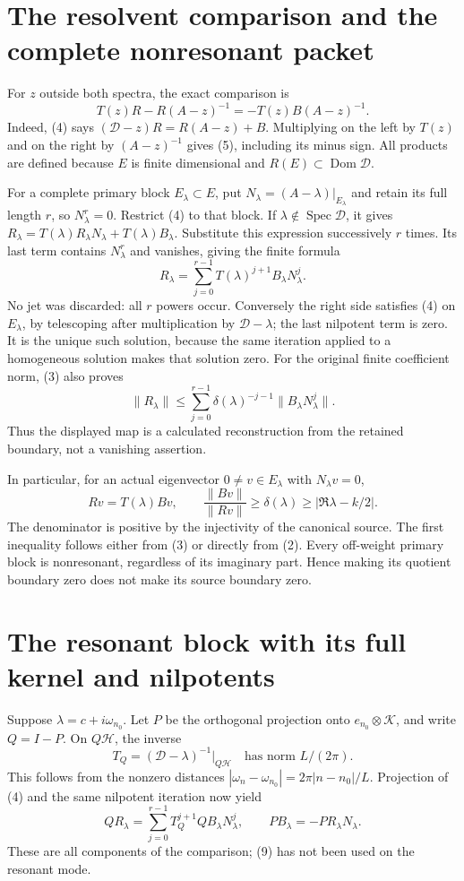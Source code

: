 \documentclass[11pt]{article}
\begin{document}
\section{The resolvent comparison and the complete nonresonant packet}
For \(z\) outside both spectra, the exact comparison is
\[
 T(z)R-R(A-z)^{-1}=-T(z)B(A-z)^{-1}.
 \tag{5}
\]
Indeed, (4) says
\((\mathscr D-z)R=R(A-z)+B\). Multiplying on the left by
\(T(z)\) and on the right by \((A-z)^{-1}\) gives (5), including
its minus sign. All products are defined because \(E\) is finite
dimensional and \(R(E)\subset\operatorname{Dom}\mathscr D\).

For a complete primary block \(E_\lambda\subset E\), put
\(N_\lambda=(A-\lambda)|_{E_\lambda}\) and retain its full
length \(r\), so \(N_\lambda^r=0\). Restrict (4) to that block.
If \(\lambda\notin\operatorname{Spec}\mathscr D\), it gives
\(R_\lambda=T(\lambda)R_\lambda N_\lambda+T(\lambda)B_\lambda\).
Substitute this expression successively \(r\) times. Its last
term contains \(N_\lambda^r\) and vanishes, giving the finite formula
\[
 \boxed{R_\lambda=
 \sum_{j=0}^{r-1}T(\lambda)^{j+1}B_\lambda N_\lambda^j.}
 \tag{6}
\]
No jet was discarded: all \(r\) powers occur. Conversely the right
side satisfies (4) on \(E_\lambda\), by telescoping after
multiplication by \(\mathscr D-\lambda\); the last nilpotent term
is zero. It is the unique such solution, because the same iteration
applied to a homogeneous solution makes that solution zero.
For the original finite coefficient norm, (3) also proves
\[
 \|R_\lambda\|
 \le\sum_{j=0}^{r-1}\delta(\lambda)^{-j-1}
                     \|B_\lambda N_\lambda^j\|.
 \tag{7}
\]
Thus the displayed map is a calculated reconstruction from the
retained boundary, not a vanishing assertion.

In particular, for an actual eigenvector \(0\ne v\in E_\lambda\)
with \(N_\lambda v=0\),
\[
 Rv=T(\lambda)Bv,\qquad
 \frac{\|Bv\|}{\|Rv\|}\ge\delta(\lambda)
 \ge|\Re\lambda-k/2|.
 \tag{8}
\]
The denominator is positive by the injectivity of the canonical
source. The first inequality follows either from (3) or directly
from (2). Every off-weight primary block is nonresonant, regardless
of its imaginary part. Hence making its quotient boundary zero does
not make its source boundary zero.

\section{The resonant block with its full kernel and nilpotents}
Suppose \(\lambda=c+i\omega_{n_0}\). Let \(P\) be the orthogonal
projection onto \(e_{n_0}\otimes\mathcal K\), and write \(Q=I-P\).
On \(Q\mathscr H\), the inverse
\[
 T_Q=(\mathscr D-\lambda)^{-1}|_{Q\mathscr H}
 \quad\text{has norm }L/(2\pi).
 \tag{9}
\]
This follows from the nonzero distances
\(|\omega_n-\omega_{n_0}|=2\pi|n-n_0|/L\).
Projection of (4) and the same nilpotent iteration now yield
\[
 QR_\lambda=\sum_{j=0}^{r-1}T_Q^{j+1}QB_\lambda N_\lambda^j,
 \qquad
 PB_\lambda=-PR_\lambda N_\lambda.
 \tag{10}
\]
These are all components of the comparison; (9) has not been used
on the resonant mode.
\end{document}
